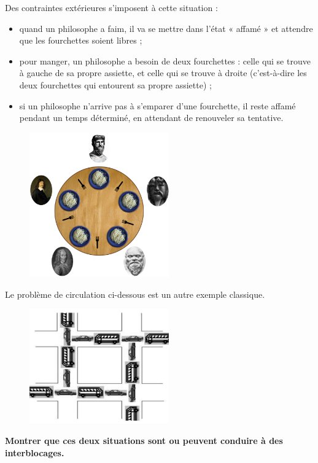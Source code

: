 \documentclass[a4paper,11pt]{article}
\begin{document}
\begin{Form}
Des contraintes extérieures s'imposent à cette situation :
\begin{itemize}
\item quand un philosophe a faim, il va se mettre dans l'état « affamé » et attendre que les fourchettes soient libres ;
\item pour manger, un philosophe a besoin de deux fourchettes : celle qui se trouve à gauche de sa propre assiette, et celle qui se trouve à droite (c'est-à-dire les deux fourchettes qui entourent sa propre assiette) ;
\item si un philosophe n'arrive pas à s'emparer d'une fourchette, il reste affamé pendant un temps déterminé, en attendant de renouveler sa tentative.
\end{itemize}
\begin{figure}[!h]
\centering
\includegraphics[width=6cm]{ressources/philo.png}
\label{philo}
\end{figure}
Le problème de circulation ci-dessous est un autre exemple classique.
\begin{figure}[!h]
\centering
\includegraphics[width=6cm]{ressources/circulation.png}
\label{circulation}
\end{figure}
\begin{center}
\textbf{Montrer que ces deux situations sont ou peuvent conduire à des interblocages.}
\end{center}
\end{Form}
\end{document}
